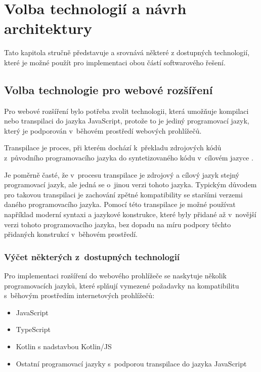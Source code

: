 \chapter{Volba technologií a návrh architektury}

Tato kapitola stručně představuje a srovnává některé z dostupných technologií, které je možné použít pro implementaci obou částí softwarového řešení. 

\section{Volba technologie pro webové rozšíření}

Pro webové rozšíření bylo potřeba zvolit technologii, která umožňuje kompilaci nebo transpilaci do jazyka JavaScript, protože to je jediný programovací jazyk, který je podporován v~běhovém prostředí webových prohlížečů.

Transpilace je proces, při kterém dochází k~překladu zdrojových kódů z~původního programovacího jazyka do syntetizovaného kódu v~cílovém jazyce \cite{fowler_transparent_2013}. 

Je poměrně časté, že v~procesu transpilace je zdrojový a cílový jazyk stejný programovací jazyk, ale jedná se o~jinou verzi tohoto jazyka. Typickým důvodem pro takovou transpilaci je zachování zpětné kompatibility se staršími verzemi daného programovacího jazyka. Pomocí této transpilace je možné používat například moderní syntaxi a jazykové konstrukce, které byly přidané až v~novější verzi tohoto programovacího jazyka, bez dopadu na míru podpory těchto přidaných konstrukcí v~běhovém prostředí.

\subsection{Výčet některých z~dostupných technologií}

Pro implementaci rozšíření do webového prohlížeče se naskytuje několik programovacích jazyků, které splňují vymezené požadavky na kompatibilitu s~běhovým prostředím internetových prohlížečů:

\begin{itemize}
    \item JavaScript
    \item TypeScript
    \item Kotlin s nadstavbou Kotlin/JS
    \item Ostatní programovací jazyky s~podporou transpilace do jazyka JavaScript
\end{itemize}

